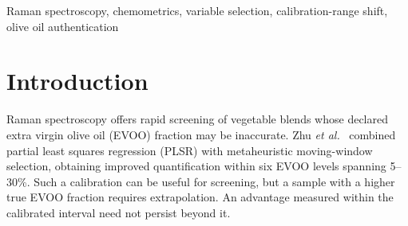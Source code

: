 \begin{abstract}
Raman models for quantifying extra virgin olive oil (EVOO) in vegetable blends are commonly evaluated within their calibration range, although screening samples can exceed it. We investigate what makes variable selection robust under this shift using 605 public EVOO--sunflower spectra: calibration covers 0--31\% EVOO and the main test comprises 140 spectra at 50--100\%. Full-spectrum partial least squares regression (PLSR), genetic-algorithm and grey-wolf moving-window selection, Variable Importance in Projection (VIP), and interval PLS are compared under unit-variance scaling and mean centering. Every fitted condition uses 15 matched, mixture-grouped CV assignments; optimizer randomness uses the corresponding seed IDs. At published search budgets, unit-variance PLSR, GA-MW and GWO-MW give mean prediction errors of \UnitPLSR, \UnitGA\ and \UnitGWO\ EVOO percentage points; under mean centering the corresponding errors are \MeanPLSR, \MeanGA\ and \MeanGWO. Refitting identical selected channels at matched latent-variable counts separates scaling from model complexity. A simple calibration-variance filter obtains unit-variance error \UnitVarianceHalf, supporting a weighting explanation for part of the selection benefit. VIP reaches \UnitVIP\ under unit variance. Five calibration windows show that the preferred selection strategy depends on both scaling and concentration coverage. These results identify conditions for robustness rather than a uniformly superior selector.
\end{abstract}

\begin{IEEEkeywords}
Raman spectroscopy, chemometrics, variable selection, calibration-range shift, olive oil authentication
\end{IEEEkeywords}

\section{Introduction}
Raman spectroscopy offers rapid screening of vegetable blends whose declared extra virgin olive oil (EVOO) fraction may be inaccurate. Zhu \textit{et al.}~\cite{zhu2023} combined partial least squares regression (PLSR) with metaheuristic moving-window selection, obtaining improved quantification within six EVOO levels spanning 5--30\%. Such a calibration can be useful for screening, but a sample with a higher true EVOO fraction requires extrapolation. An advantage measured within the calibrated interval need not persist beyond it.

